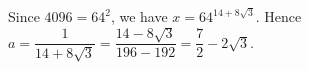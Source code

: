 Since $4096=64^2$, we have $x=64^{14+8\sqrt3}$. Hence $a=\dfrac{1}{14+8\sqrt3}=\dfrac{14-8\sqrt3}{196-192}=\boxed{\dfrac{7}{2}-2\sqrt3}$.

